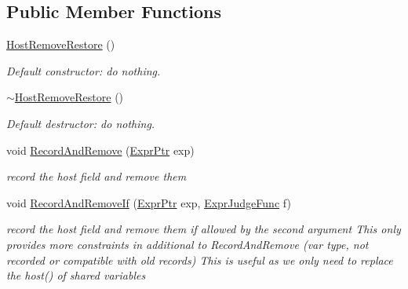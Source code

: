 \subsection*{Public Member Functions}
\begin{DoxyCompactItemize}
\item 
\mbox{\label{classilang_1_1_host_remove_restore_a31be62debd3a138eb7dea4e0bea5692f}} 
\mbox{\hyperlink{classilang_1_1_host_remove_restore_a31be62debd3a138eb7dea4e0bea5692f}{Host\+Remove\+Restore}} ()
\begin{DoxyCompactList}\small\item\em Default constructor\+: do nothing. \end{DoxyCompactList}\item 
\mbox{\label{classilang_1_1_host_remove_restore_a77e6d0983f1fba71a90d8f5ed0dabce6}} 
\mbox{\hyperlink{classilang_1_1_host_remove_restore_a77e6d0983f1fba71a90d8f5ed0dabce6}{$\sim$\+Host\+Remove\+Restore}} ()
\begin{DoxyCompactList}\small\item\em Default destructor\+: do nothing. \end{DoxyCompactList}\item 
\mbox{\label{classilang_1_1_host_remove_restore_af382d6d3dde828ecc1df556af1519644}} 
void \mbox{\hyperlink{classilang_1_1_host_remove_restore_af382d6d3dde828ecc1df556af1519644}{Record\+And\+Remove}} (\mbox{\hyperlink{namespaceilang_a7c4196c72e53ea4df4b7861af7bc3bce}{Expr\+Ptr}} exp)
\begin{DoxyCompactList}\small\item\em record the host field and remove them \end{DoxyCompactList}\item 
\mbox{\label{classilang_1_1_host_remove_restore_aab043ec92a30fc001e9f86c97d9dc2de}} 
void \mbox{\hyperlink{classilang_1_1_host_remove_restore_aab043ec92a30fc001e9f86c97d9dc2de}{Record\+And\+Remove\+If}} (\mbox{\hyperlink{namespaceilang_a7c4196c72e53ea4df4b7861af7bc3bce}{Expr\+Ptr}} exp, \mbox{\hyperlink{classilang_1_1_host_remove_restore_ad6fe1a90d3e53376a4a4564bb36a4eb5}{Expr\+Judge\+Func}} f)
\begin{DoxyCompactList}\small\item\em record the host field and remove them if allowed by the second argument This only provides more constraints in additional to Record\+And\+Remove (var type, not recorded or compatible with old records) This is useful as we only need to replace the host() of shared variables \end{DoxyCompactList}\item 

\end{DoxyCompactItemize}
